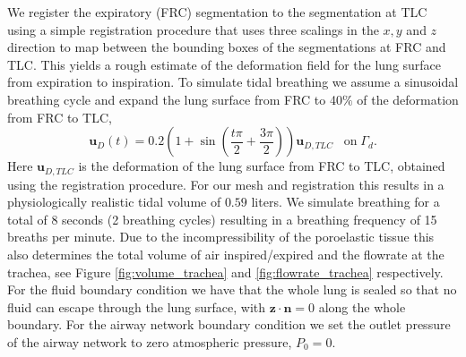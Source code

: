 We register the expiratory (FRC) segmentation to the segmentation at TLC using a simple registration procedure that uses three scalings in the $x,y$ and $z$ direction to map between the bounding boxes of the segmentations at FRC and TLC. This yields a rough estimate of the deformation field for the lung surface from expiration to inspiration. To simulate tidal breathing we assume a sinusoidal breathing cycle and expand the lung surface from FRC to 40$\%$ of the deformation from FRC to TLC,
 \begin{equation}
 \boldsymbol{u}_{D}(t)=  0.2\left(1+\sin\left( \frac{t\pi}{2}+\frac{3\pi}{2}\right)\right)\boldsymbol{u}_{D,TLC}\;\;\; \mbox{on}\; \Gamma_{d}.
 \label{eqn:deform_bc}
 \end{equation}
Here $\boldsymbol{u}_{D,TLC}$ is the deformation of the lung surface from FRC to TLC, obtained using the registration procedure. For our mesh and registration this results in a physiologically realistic tidal volume of $0.59$ liters. We simulate breathing for a total of 8 seconds (2 breathing cycles) resulting in a breathing frequency of 15 breaths per minute. Due to the incompressibility of the poroelastic tissue this also determines the total volume of air inspired/expired and the flowrate at the trachea, see Figure \ref{fig:volume_trachea} and \ref{fig:flowrate_trachea} respectively.
For the fluid boundary condition we have that the whole lung is sealed so that no fluid can escape through the lung surface, with $\boldsymbol{z}\cdot \boldsymbol{n} =0$ along the whole boundary. For the airway network boundary condition we set the outlet pressure of the airway network to zero atmospheric pressure, $P_{0}=0$.
%
